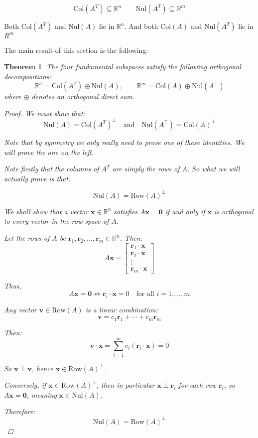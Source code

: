 \documentclass[11pt]{article}
\newtheorem{theorem}{Theorem}
\begin{document}
\[ \mathrm{Col}(A^T) \subseteq \mathbb{R}^n   \qquad
\mathrm{Nul}(A^T) \subseteq \mathbb{R}^m
\]

Both $\mathrm{Col}(A^T)$ and $\mathrm{Nul}(A)$ lie in $\mathbb{R}^n$. And both $\mathrm{Col}(A)$ and $\mathrm{Nul}(A^T)$ lie in $R^m$

The main result of this section is the following:

\begin{theorem}
The four fundamental subspaces satisfy the following orthogonal decompositions:
\[
\mathbb{R}^n = \mathrm{Col}(A^T) \oplus \mathrm{Nul}(A), \qquad
\mathbb{R}^m = \mathrm{Col}(A) \oplus \mathrm{Nul}(A^\top)
\]
where \( \oplus \) denotes an orthogonal direct sum.

\begin{proof}
We must show that:
\[
\boxed{\mathrm{Nul}(A) = \mathrm{Col}(A^T)^\perp} \quad \text{and} \quad \boxed{\mathrm{Nul}(A^\top) = \mathrm{Col}(A)^\perp}
\]

Note that by symmetry we only really need to prove one of these identities. We will prove the one on the left. 

Note firstly that the columns of $A^T$ are simply the rows of $A$.
So what we will actually prove is that:

\[ \mathrm{Nul}(A) = \mathrm{Row}(A)^\perp\]

We shall show that a vector \( \mathbf{x} \in \mathbb{R}^n \) satisfies \( A\mathbf{x} = \mathbf{0} \) if and only if \( \mathbf{x} \) is orthogonal to every vector in the row space of \( A \).

Let the rows of \( A \) be \( \mathbf{r}_1, \mathbf{r}_2, \dots, \mathbf{r}_m \in \mathbb{R}^n \). Then:
\[
A\mathbf{x} = 
\begin{bmatrix}
\mathbf{r}_1 \cdot \mathbf{x} \\
\mathbf{r}_2 \cdot \mathbf{x} \\
\vdots \\
\mathbf{r}_m \cdot \mathbf{x}
\end{bmatrix}
\]

Thus,
\[
A\mathbf{x} = \mathbf{0} \iff \mathbf{r}_i \cdot \mathbf{x} = 0 \quad \text{for all } i = 1, \dots, m
\]

Any vector \( \mathbf{v} \in \mathrm{Row}(A) \) is a linear combination:
\[
\mathbf{v} = c_1 \mathbf{r}_1 + \cdots + c_m \mathbf{r}_m
\]

Then:
\[
\mathbf{v} \cdot \mathbf{x} = \sum_{i=1}^m c_i (\mathbf{r}_i \cdot \mathbf{x}) = 0
\]

So \( \mathbf{x} \perp \mathbf{v} \), hence \( \mathbf{x} \in \mathrm{Row}(A)^\perp \).

Conversely, if \( \mathbf{x} \in \mathrm{Row}(A)^\perp \), then in particular \( \mathbf{x} \perp \mathbf{r}_i \) for each row \( \mathbf{r}_i \), so \( A\mathbf{x} = \mathbf{0} \), meaning \( \mathbf{x} \in \mathrm{Nul}(A) \).

Therefore:
\[
\boxed{\mathrm{Nul}(A) = \mathrm{Row}(A)^\perp}
\]



\end{proof}


\end{theorem}
\end{document}
